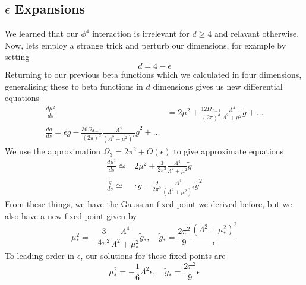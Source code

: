 \subsection{$ \epsilon $ Expansions} 
We learned that our $ \phi ^ 4 $ interaction 
is irrelevant for $ d \geq 4 $ and relavant otherwise. 
Now, lets employ a strange trick and perturb our
dimensions, for example by setting 
\[
 d  = 4 - \epsilon  
\] Returning to our previous beta functions 
which we calculated in four dimensions, generalising 
these to beta functions in $ d $ dimensions gives us 
new differential equations 
\begin{align*}
	\frac{ d \mu ^ 2 }{ ds } &=  2 \mu ^ 2 + 
	\frac{ 12 \Omega_{ d- 1 } }{ ( 2 \pi ) ^ d } \frac{ \Lambda ^ 4  }{ 
	\Lambda ^ 2 + \mu ^ 2  }  \tilde{ g } + \dots  \\
	\frac{ d \tilde{ g }  }{ds } = 
	\epsilon \tilde{ g } - \frac{ 36 \Omega_{ d- 1 } }{ ( 2 \pi ) ^ d }
	\frac{ \Lambda ^ 4 }{ ( \Lambda ^ 2 + \mu ^ 2 ) ^ 2 } \tilde{ g } ^ 2 + \dots 
\end{align*}
We use the approximation $ \Omega_ 3  = 2 \pi ^ 2 + O ( \epsilon ) $ 
to give approximate equations 
 \begin{align*}
	 \frac{ d \mu ^ 2 }{ds } \simeq & 2 \mu ^ 2 + \frac{3}{2 \pi ^ 2 } \frac{
	 \Lambda ^ 4 }{ \Lambda ^ 2 + \mu ^ 2 } \tilde{ g } \\
	 \frac{ \tilde{g }  }{ds  } \simeq & 
	 \epsilon g  - \frac{ 9 }{ 2 \pi ^ 2 } \frac{ \Lambda ^ 4 }{
	 ( \Lambda ^ 2 + \mu ^ 2 ) ^ 2 } \tilde{g } ^ 2  
\end{align*}
From these things, we have the Gaussian 
fixed point we derived before, but 
we also have a new fixed point given by 
\[
 \mu _{ * } ^ 2 = - \frac{3 }{ 4 \pi ^ 2 } \frac{ \Lambda ^ 4 }{ 
 \Lambda ^ 2 + \mu _ * ^ 2 } \tilde{ g } _ * , \quad 
 \tilde{ g } _ * = \frac{ 2 \pi ^ 2 }{ 9 } \frac{ ( \Lambda ^ 2 + \mu _ * ^ 2 ) ^ 2 }{
 \epsilon } 
\] To leading order in $\epsilon $, our solutions for these 
fixed points are 
\[
 \mu _ * ^ 2 =  - \frac{1}{6 } \Lambda  ^2 \epsilon , \quad 
 \tilde{ g } _ *  = \frac{ 2 \pi ^ 2  }{ 9 }  \epsilon 
\] 
